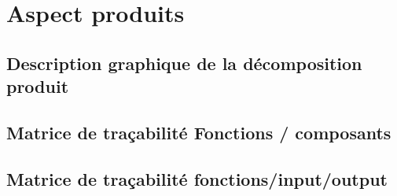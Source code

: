 
\section{Aspect produits }

\subsection{ Description graphique de la décomposition produit }




	
	\subsection{ Matrice de traçabilité Fonctions / composants }
	
	




\subsection{ Matrice de traçabilité fonctions/input/output }

